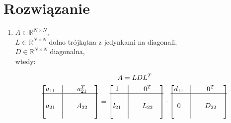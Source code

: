\documentclass[a4paper]{article}
\newcommand{\R}{\mathbb R} %
\begin{document}
    \section*{\large Rozwiązanie}

        \begin{enumerate}[label=(\alph*)]
            \item
                $A \in \R^{N \times N}$, \\
                $L \in \R^{N \times N}$ dolno trójkątna z jedynkami na diagonali, \\
                $D \in \R^{N \times N}$ diagonalna, \\
                wtedy:

                \begin{gather*}
                    A = LDL^{T} \\
                    \begin{bmatrix}
                        a_{11} & \vline & & a_{21}^{T} & \\
                        \hline
                               & \vline & &            & \\
                        a_{21} & \vline & & A_{22}     & \\
                               & \vline & &            & \\
                    \end{bmatrix}
                    =
                    \begin{bmatrix}
                        1      & \vline & & 0^{T}      & \\
                        \hline
                               & \vline & &            & \\
                        l_{21} & \vline & & L_{22}     & \\
                               & \vline & &            & \\
                    \end{bmatrix}
                    \cdot
                    \begin{bmatrix}
                        d_{11} & \vline & & 0^{T}      & \\
                        \hline
                               & \vline & &            & \\
                        0      & \vline & & D_{22}     & \\
                               & \vline & &            & \\

\end{bmatrix}
\end{gather*}
\end{enumerate}
\end{document}
